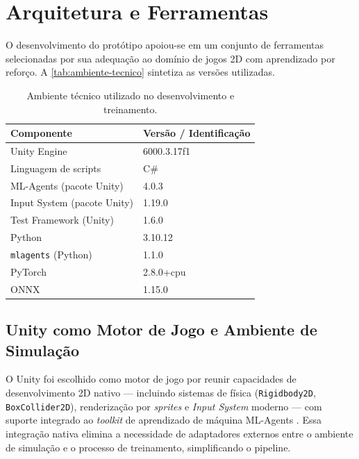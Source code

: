 \section{Arquitetura e Ferramentas}
\label{sec:arquitetura-ferramentas}

O desenvolvimento do protótipo apoiou-se em um conjunto de ferramentas
selecionadas por sua adequação ao domínio de jogos 2D com aprendizado por
reforço. A \autoref{tab:ambiente-tecnico} sintetiza as versões utilizadas.

\begin{table}[htb]
    \centering
    \caption{Ambiente técnico utilizado no desenvolvimento e treinamento.}
    \label{tab:ambiente-tecnico}
    \begin{tabular}{l l}
        \toprule
        \textbf{Componente}         & \textbf{Versão / Identificação} \\
        \midrule
        Unity Engine                & 6000.3.17f1                     \\
        Linguagem de scripts        & C\#                             \\
        ML-Agents (pacote Unity)    & 4.0.3                           \\
        Input System (pacote Unity) & 1.19.0                          \\
        Test Framework (Unity)      & 1.6.0                           \\
        Python                      & 3.10.12                         \\
        \texttt{mlagents} (Python)  & 1.1.0                           \\
        PyTorch                     & 2.8.0+cpu                       \\
        ONNX                        & 1.15.0                          \\
        \bottomrule
    \end{tabular}
\end{table}

\subsection{Unity como Motor de Jogo e Ambiente de Simulação}
\label{subsec:unity-motor}

O Unity \cite{unity2024} foi escolhido como motor de jogo por reunir
capacidades de desenvolvimento 2D nativo --- incluindo sistemas de física
(\texttt{Rigidbody2D}, \texttt{BoxCollider2D}), renderização por
\textit{sprites} e \textit{Input System} moderno --- com suporte integrado ao
\textit{toolkit} de aprendizado de máquina ML-Agents
\cite{juliani2020unity}. Essa integração nativa elimina a necessidade de
adaptadores externos entre o ambiente de simulação e o processo de
treinamento, simplificando o pipeline.

